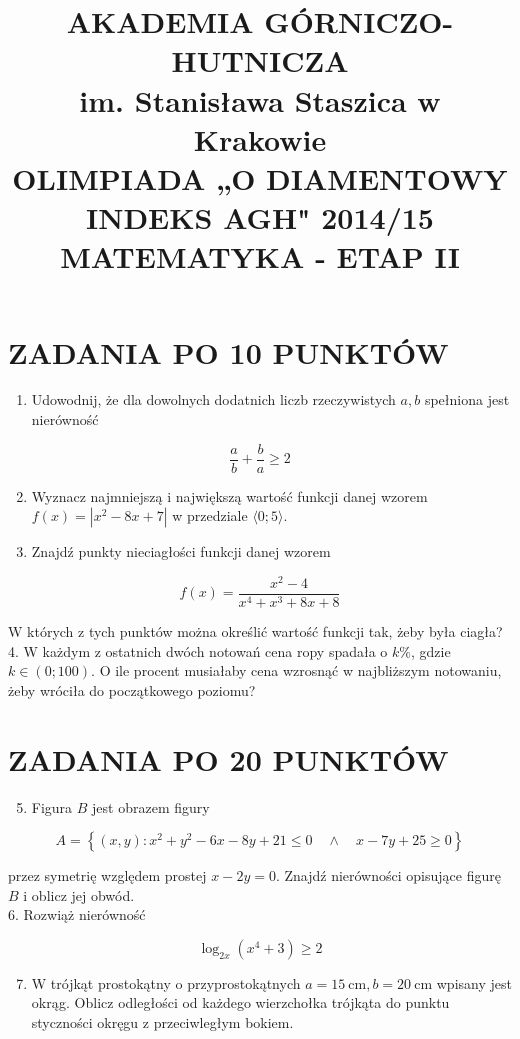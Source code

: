 \documentclass[10pt]{article}
\title{AKADEMIA GÓRNICZO-HUTNICZA \\
 im. Stanisława Staszica w Krakowie \\
 OLIMPIADA „O DIAMENTOWY INDEKS AGH" 2014/15 \\
 MATEMATYKA - ETAP II }
\author{}
\date{}
\begin{document}
\maketitle
\section*{ZADANIA PO 10 PUNKTÓW}
\begin{enumerate}
  \item Udowodnij, że dla dowolnych dodatnich liczb rzeczywistych $a, b$ spełniona jest nierówność
\end{enumerate}

$$
\frac{a}{b}+\frac{b}{a} \geq 2
$$

\begin{enumerate}
  \setcounter{enumi}{1}
  \item Wyznacz najmniejszą i największą wartość funkcji danej wzorem $f(x)=\left|x^{2}-8 x+7\right|$ w przedziale $\langle 0 ; 5\rangle$.
  \item Znajdź punkty nieciagłości funkcji danej wzorem
\end{enumerate}

$$
f(x)=\frac{x^{2}-4}{x^{4}+x^{3}+8 x+8}
$$

W których z tych punktów można określić wartość funkcji tak, żeby była ciagła?\\
4. W każdym z ostatnich dwóch notowań cena ropy spadała o $k \%$, gdzie $k \in(0 ; 100)$. O ile procent musiałaby cena wzrosnąć w najbliższym notowaniu, żeby wróciła do początkowego poziomu?

\section*{ZADANIA PO 20 PUNKTÓW}
\begin{enumerate}
  \setcounter{enumi}{4}
  \item Figura $B$ jest obrazem figury
\end{enumerate}

$$
A=\left\{(x, y): x^{2}+y^{2}-6 x-8 y+21 \leq 0 \quad \wedge \quad x-7 y+25 \geq 0\right\}
$$

przez symetrię względem prostej $x-2 y=0$. Znajdź nierówności opisujące figurę $B$ i oblicz jej obwód.\\
6. Rozwiąż nierówność

$$
\log _{2 x}\left(x^{4}+3\right) \geq 2
$$

\begin{enumerate}
  \setcounter{enumi}{6}
  \item W trójkąt prostokątny o przyprostokątnych $a=15 \mathrm{~cm}, b=20 \mathrm{~cm}$ wpisany jest okrąg. Oblicz odległości od każdego wierzchołka trójkąta do punktu styczności okręgu z przeciwległym bokiem.
\end{enumerate}
\end{document}
